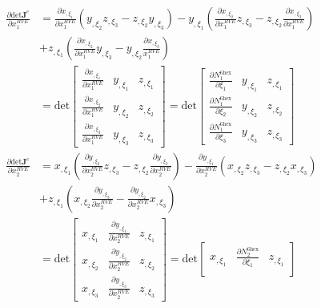 \begin{align}
\frac{\partial \text{det}\pmb{J}^e}{\partial x_1^{RVE}} &= \frac{\partial x_{,\xi_1}}{\partial x_1^{RVE}}\left(y_{,\xi_2}z_{,\xi_3} - z_{,\xi_2}y_{,\xi_3} \right) - y_{,\xi_1}\left(\frac{\partial x_{,\xi_2}}{\partial x_1^{RVE}}z_{,\xi_3}-z_{,\xi_2}\frac{\partial x_{,\xi_3}}{\partial x_1^{RVE}} \right) \nonumber \\ 
&+ z_{,\xi_1}\left(\frac{\partial x_{,\xi_2}}{\partial x_1^{RVE}}y_{,\xi_3}-y_{,\xi_2}\frac{\partial x_{,\xi_3}}{x_1^{RVE}} \right) \nonumber\\
%
&= \text{det} \begin{bmatrix}
\frac{\partial x_{,\xi_1}}{\partial x_1^{RVE}} & y_{,\xi_1} & z_{,\xi_1} \\
\frac{\partial x_{,\xi_2}}{\partial x_1^{RVE}} & y_{,\xi_2} & z_{,\xi_2} \\
\frac{\partial x_{,\xi_3}}{\partial x_1^{RVE}} & y_{,\xi_3} & z_{,\xi_3}
\end{bmatrix} 
%
= \text{det} \begin{bmatrix}
\frac{\partial N_1^{6\text{hex}}}{\partial \xi_1} & y_{,\xi_1} & z_{,\xi_1} \\
\frac{\partial N_1^{6\text{hex}}}{\partial \xi_2} & y_{,\xi_2} & z_{,\xi_2} \\
\frac{\partial N_1^{6\text{hex}}}{\partial \xi_3} & y_{,\xi_3} & z_{,\xi_3}
\end{bmatrix} \nonumber\\
\frac{\partial \text{det}\pmb{J}^e}{\partial x_2^{RVE}} &= x_{,\xi_1}\left(\frac{\partial y_{,\xi_2}}{\partial x_2^{RVE}}z_{,\xi_3} - z_{,\xi_2}\frac{\partial y_{,\xi_3}}{\partial x_2^{RVE}} \right) - \frac{\partial y_{,\xi_1}}{\partial x_2^{RVE}}\left(x_{,\xi_2}z_{,\xi_3}-z_{,\xi_2}x_{,\xi_3} \right) \nonumber \\
&+ z_{,\xi_1}\left(x_{,\xi_2}\frac{\partial y_{,\xi_3}}{\partial x_2^{RVE}}-\frac{\partial y_{,\xi_2}}{\partial x_2^{RVE}}x_{,\xi_3} \right) \nonumber\\
&= \text{det} \begin{bmatrix}
x_{,\xi_1} & \frac{\partial y_{,\xi_1}}{\partial x_2^{RVE}} & z_{,\xi_1} \\
x_{,\xi_2} & \frac{\partial y_{,\xi_2}}{\partial x_2^{RVE}} & z_{,\xi_2} \\
x_{,\xi_3} & \frac{\partial y_{,\xi_3}}{\partial x_2^{RVE}} & z_{,\xi_3}
\end{bmatrix} 
= \text{det} \begin{bmatrix}
x_{,\xi_1} & \frac{\partial N_2^{6\text{hex}}}{\partial \xi_1} & z_{,\xi_1} \\

\end{bmatrix}
\end{align}
